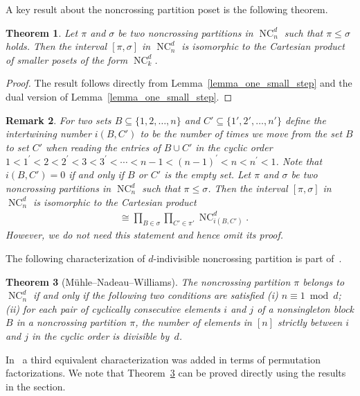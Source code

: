 \documentclass[11pt]{amsart}
\newtheorem{theorem}{Theorem}[section]
\newtheorem{remark}[theorem]{Remark}
\numberwithin{equation}{section}
\DeclareMathOperator{\NC}{NC}
\begin{document}
A key result about the noncrossing partition poset is
the following theorem.
\begin{theorem}
Let $\pi$ and $\sigma$ be two noncrossing partitions in $\NC^{d}_{n}$
such that $\pi \leq \sigma$ holds.
Then the interval $[\pi,\sigma]$ in $\NC^{d}_{n}$ is isomorphic to
the Cartesian product of smaller
posets of the form $\NC^{d}_{k}$.
\label{theorem_Cartesian_product}
\end{theorem}
\begin{proof}
The result follows directly from
Lemma~\ref{lemma_one_small_step}
and the dual version of Lemma~\ref{lemma_one_small_step}.
\end{proof}



\begin{remark}
{\rm For two sets $B \subseteq \{1,2,  \ldots, n\}$
and $C' \subseteq \{1',2',  \ldots, n'\}$
define the {\em intertwining number} $i(B,C')$
to be the number of times we move from the set $B$ to set $C'$
when reading the entries of $B \cup C'$ in the
cyclic order
$1 < 1^{\prime} <
2 < 2^{\prime} <
3 < 3^{\prime} <
\cdots <
n-1 < (n-1)^{\prime} <
n < n^{\prime} < 1$.
Note that $i(B,C') = 0$ if and only if $B$ or $C'$ is the empty set.
Let $\pi$ and $\sigma$ be two noncrossing partitions in $\NC^{d}_{n}$
such that $\pi \leq \sigma$.
Then the interval $[\pi,\sigma]$ in $\NC^{d}_{n}$ is isomorphic to
the Cartesian product
\begin{align*}
[\pi,\sigma]
& \cong
\prod_{B \in \sigma}
\prod_{C' \in \pi'}
\NC^{d}_{i(B,C')} .
\end{align*}
However, we do not need this statement and hence omit its proof.}
\end{remark}


The following characterization of $d$-indivisible noncrossing
partition is part of~\cite[Theorem~1.1]{Muhle_Nadeau_Williams}.

\begin{theorem}[M\"uhle--Nadeau--Williams]
\label{theorem_characterization}
The noncrossing partition $\pi$ belongs to $\NC^{d}_{n}$
if and only if
the following two conditions are satisfied
(i)
$n \equiv 1 \bmod d$;
(ii)
for each pair of cyclically consecutive elements $i$ and $j$
of a nonsingleton block $B$ in a noncrossing partition $\pi$,
the number of elements in $[n]$ strictly between $i$ and $j$ in the cyclic order
is divisible by~$d$.
\end{theorem}

In~\cite[Theorem~1.1]{Muhle_Nadeau_Williams} a third equivalent characterization was
added in terms of permutation factorizations. We note that 
Theorem~\ref{theorem_characterization}
can be proved directly using the results in the section.
\end{document}
